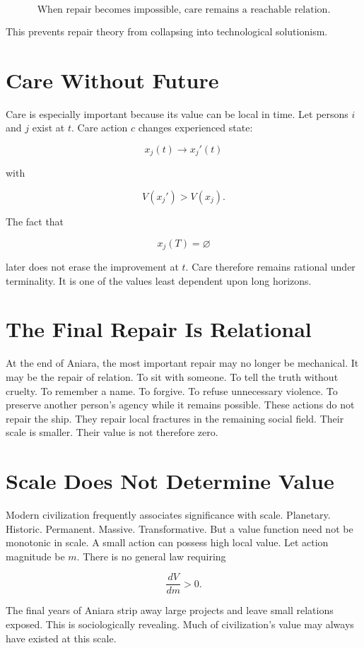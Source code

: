 \documentclass[11pt,oneside]{book}
\theoremstyle{definition}
\theoremstyle{remark}
\begin{document}
\[
\boxed{ \text{When repair becomes impossible, care remains a reachable relation.} }
\]

This prevents repair theory from collapsing into technological solutionism.

\section{Care Without Future}

Care is especially important because its value can be local in time. Let persons \(i\) and \(j\)
exist at \(t\). Care action \(c\) changes experienced state:

\[
x_j(t)\rightarrow x_j'(t)
\]

with

\[
V(x_j')>V(x_j).
\]

The fact that

\[
x_j(T)=\varnothing
\]

later does not erase the improvement at \(t\). Care therefore remains rational under terminality. It
is one of the values least dependent upon long horizons.

\section{The Final Repair Is Relational}

At the end of Aniara, the most important repair may no longer be mechanical. It may be the repair of
relation. To sit with someone. To tell the truth without cruelty. To remember a name. To forgive. To
refuse unnecessary violence. To preserve another person's agency while it remains possible. These
actions do not repair the ship. They repair local fractures in the remaining social field. Their
scale is smaller. Their value is not therefore zero.

\section{Scale Does Not Determine Value}

Modern civilization frequently associates significance with scale. Planetary. Historic. Permanent.
Massive. Transformative. But a value function need not be monotonic in scale. A small action can
possess high local value. Let action magnitude be \(m\). There is no general law requiring

\[
\frac{dV}{dm}>0.
\]

The final years of Aniara strip away large projects and leave small relations exposed. This is
sociologically revealing. Much of civilization's value may always have existed at this scale.
\end{document}
